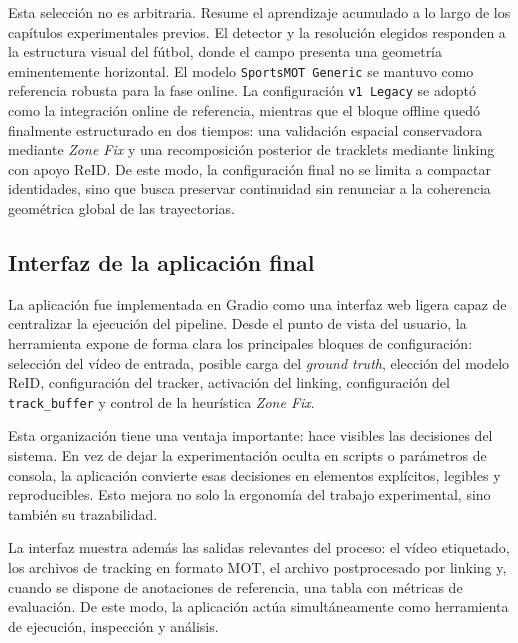 \documentclass[../MAIN.tex]{subfiles}
\begin{document}
	Esta selección no es arbitraria. Resume el aprendizaje acumulado a lo largo de los capítulos experimentales previos. El detector y la resolución elegidos responden a la estructura visual del fútbol, donde el campo presenta una geometría eminentemente horizontal. El modelo \texttt{SportsMOT Generic} se mantuvo como referencia robusta para la fase online. La configuración \texttt{v1 Legacy} se adoptó como la integración online de referencia, mientras que el bloque offline quedó finalmente estructurado en dos tiempos: una validación espacial conservadora mediante \textit{Zone Fix} y una recomposición posterior de tracklets mediante linking con apoyo ReID. De este modo, la configuración final no se limita a compactar identidades, sino que busca preservar continuidad sin renunciar a la coherencia geométrica global de las trayectorias.
	
	\subsection{Interfaz de la aplicación final}
	
	La aplicación fue implementada en Gradio como una interfaz web ligera capaz de centralizar la ejecución del pipeline. Desde el punto de vista del usuario, la herramienta expone de forma clara los principales bloques de configuración: selección del vídeo de entrada, posible carga del \textit{ground truth}, elección del modelo ReID, configuración del tracker, activación del linking, configuración del \texttt{track\_buffer} y control de la heurística \textit{Zone Fix}.
	
	Esta organización tiene una ventaja importante: hace visibles las decisiones del sistema. En vez de dejar la experimentación oculta en scripts o parámetros de consola, la aplicación convierte esas decisiones en elementos explícitos, legibles y reproducibles. Esto mejora no solo la ergonomía del trabajo experimental, sino también su trazabilidad.
	
	
	La interfaz muestra además las salidas relevantes del proceso: el vídeo etiquetado, los archivos de tracking en formato MOT, el archivo postprocesado por linking y, cuando se dispone de anotaciones de referencia, una tabla con métricas de evaluación. De este modo, la aplicación actúa simultáneamente como herramienta de ejecución, inspección y análisis.
	
\end{document}
